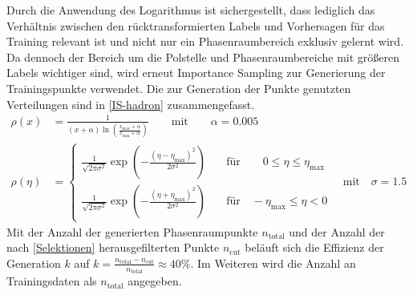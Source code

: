 Durch die Anwendung des Logarithmus ist sichergestellt, dass lediglich das Verhältnis zwischen den rücktransformierten Labels und Vorhersagen für das Training relevant ist und nicht nur ein Phasenraumbereich exklusiv gelernt wird. Da dennoch der Bereich um die Polstelle und Phasenraumbereiche mit größeren Labels wichtiger sind, wird erneut Importance Sampling zur Generierung der Trainingspunkte verwendet. Die zur Generation der Punkte genutzten Verteilungen sind in \textsf{\autoref{IS-hadron}} zusammengefasst.  
\begin{equation}
\begin{aligned}
\rho(x) &= \frac{1}{(x + \alpha)\ln(\frac{x_{\text{max}} + \alpha}{x_{\text{min}}+ \alpha})} \qquad \text{mit} \qquad \alpha = 0.005 \\
\rho(\eta) &= \begin{cases}
\frac{1}{\sqrt{2\pi \sigma^2}} \exp(-\frac{(\eta - \eta_{\text{max}})^2}{2\sigma^2}) \quad & \text{für} \qquad 0 \leq \eta \leq \eta_{\text{max}}\\
\frac{1}{\sqrt{2\pi \sigma^2}} \exp(-\frac{(\eta + \eta_{\text{max}})^2}{2\sigma^2}) \quad & \text{für} \quad -\eta_{\text{max}} \leq \eta < 0
\end{cases} \quad \text{mit} \quad \sigma = 1.5
\end{aligned}
\label{IS-hadron}
\end{equation}
Mit der Anzahl der generierten Phasenraumpunkte $n_{\text{total}}$ und der Anzahl der nach \textsf{\autoref{Selektionen}} herausgefilterten Punkte $n_{\text{cut}}$ beläuft sich die Effizienz der Generation $k$ auf $k = \frac{n_{\text{total}} - n_{\text{cut}}}{n_{\text{total}}} \approx 40 \%$. Im Weiteren wird die Anzahl an Trainingsdaten als $n_{\text{total}}$ angegeben.

